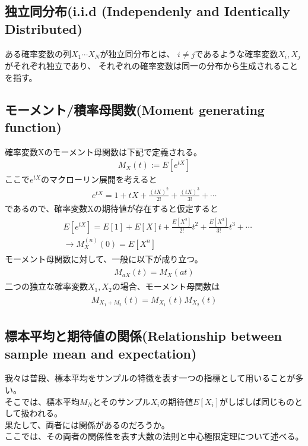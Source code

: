 \documentclass[a4j]{jarticle}
\begin{document}
\subsection{独立同分布(i.i.d (Independenly and Identically Distributed)}
ある確率変数の列$X_{1} \cdots X_{N}$が独立同分布とは、
$i \neq j$であるような確率変数$X_{i},X_{j}$がそれぞれ独立であり、
それぞれの確率変数は同一の分布から生成されることを指す。

\subsection{モーメント/積率母関数(Moment generating function)}
確率変数Xのモーメント母関数は下記で定義される。
\begin{align}
    M_{X}(t) := E[e^{tX}]
\end{align}
ここで$e^{tX}$のマクローリン展開を考えると
\begin{align}
    e^{tX}=1+tX+\frac{(tX)^2}{2!}+\frac{(tX)^3}{3!}+\cdots
\end{align}
であるので、確率変数Xの期待値が存在すると仮定すると
\begin{align}
    \begin{aligned}
    &E[e^{tX}]=E[1]+E[X]t+\frac{E[X^2]}{2!}t^2+\frac{E[X^3]}{3!}t^3+\cdots \\
    &\rightarrow M_{X}^{(n)}(0)=E[X^n]
    \end{aligned}  
\end{align}
モーメント母関数に対して、一般に以下が成り立つ。
\begin{align}
    \begin{aligned}
    M_{aX}(t) = M_{X}(at)
    \end{aligned}  
\end{align}
二つの独立な確率変数$X_{1},X_{2}$の場合、モーメント母関数は
\begin{align}
    \begin{aligned}
    M_{X_{1}+M_{2}}(t) = M_{X_{1}}(t)M_{X_{2}}(t)
    \end{aligned}  
\end{align}


\subsection{標本平均と期待値の関係(Relationship between sample mean and expectation)}
我々は普段、標本平均をサンプルの特徴を表す一つの指標として用いることが多い。\\
そこでは、標本平均$M_{N}$とそのサンプル$X_{i}$の期待値$E[X_{i}]$がしばしば同じものとして扱われる。 \\
果たして、両者には関係があるのだろうか。\\
ここでは、その両者の関係性を表す大数の法則と中心極限定理について述べる。
\end{document}
